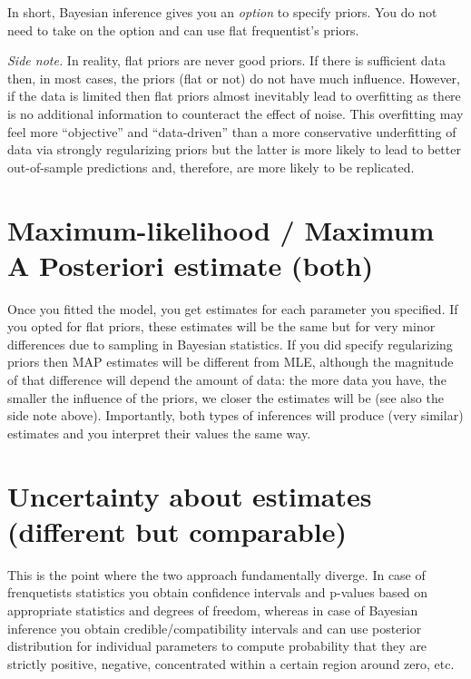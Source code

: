 \documentclass[
]{book}
\begin{document}
In short, Bayesian inference gives you an \emph{option} to specify priors. You do not need to take on the option and can use flat frequentist's priors.

\emph{Side note.} In reality, flat priors are never good priors. If there is sufficient data then, in most cases, the priors (flat or not) do not have much influence. However, if the data is limited then flat priors almost inevitably lead to overfitting as there is no additional information to counteract the effect of noise. This overfitting may feel more ``objective'' and ``data-driven'' than a more conservative underfitting of data via strongly regularizing priors but the latter is more likely to lead to better out-of-sample predictions and, therefore, are more likely to be replicated.

\hypertarget{maximum-likelihood-maximum-a-posteriori-estimate-both}{%
\section{Maximum-likelihood / Maximum A Posteriori estimate (both)}\label{maximum-likelihood-maximum-a-posteriori-estimate-both}}

Once you fitted the model, you get estimates for each parameter you specified. If you opted for flat priors, these estimates will be the same but for very minor differences due to sampling in Bayesian statistics. If you did specify regularizing priors then MAP estimates will be different from MLE, although the magnitude of that difference will depend the amount of data: the more data you have, the smaller the influence of the priors, we closer the estimates will be (see also the side note above). Importantly, both types of inferences will produce (very similar) estimates and you interpret their values the same way.

\hypertarget{uncertainty-about-estimates-different-but-comparable}{%
\section{Uncertainty about estimates (different but comparable)}\label{uncertainty-about-estimates-different-but-comparable}}

This is the point where the two approach fundamentally diverge. In case of frenquetists statistics you obtain confidence intervals and p-values based on appropriate statistics and degrees of freedom, whereas in case of Bayesian inference you obtain credible/compatibility intervals and can use posterior distribution for individual parameters to compute probability that they are strictly positive, negative, concentrated within a certain region around zero, etc.
\end{document}
